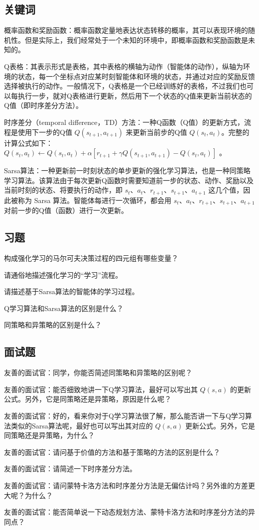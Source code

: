 \subsection{关键词}

概率函数和奖励函数：概率函数定量地表达状态转移的概率，其可以表现环境的随机性。但是实际上，我们经常处于一个未知的环境中，即概率函数和奖励函数是未知的。

Q表格：其表示形式是表格，其中表格的横轴为动作（智能体的动作），纵轴为环境的状态，每一个坐标点对应某时刻智能体和环境的状态，并通过对应的奖励反馈选择被执行的动作。一般情况下，Q表格是一个已经训练好的表格，不过我们也可以每执行一步，就对Q表格进行更新，然后用下一个状态的Q值来更新当前状态的Q值（即时序差分方法）。

时序差分（temporal difference，TD）方法：一种Q函数（Q值）的更新方式，流程是使用下一步的Q值 $Q(s_{t+1},a_{t+1})$ 来更新当前步的Q值 $Q(s_t,a_t)$。完整的计算公式如下：$Q(s_t,a_t) \leftarrow Q(s_t,a_t) + \alpha [r_{t+1}+\gamma Q(s_{t+1},a_{t+1})-Q(s_t,a_t)]$ 。

Sarsa算法：一种更新前一时刻状态的单步更新的强化学习算法，也是一种同策略学习算法。该算法由于每次更新Q函数时需要知道前一步的状态、动作、奖励以及当前时刻的状态、将要执行的动作，即 $s_{t}$、$a_{t}$、$r_{t+1}$、$s_{t+1}$、$a_{t+1}$ 这几个值，因此被称为 Sarsa 算法。智能体每进行一次循环，都会用 $s_{t}$、$a_{t}$、$r_{t+1}$、$s_{t+1}$、$a_{t+1}$ 对前一步的Q值（函数）进行一次更新。


\subsection{习题}

 构成强化学习的马尔可夫决策过程的四元组有哪些变量？

 请通俗地描述强化学习的“学习”流程。

 请描述基于Sarsa算法的智能体的学习过程。

 Q学习算法和Sarsa算法的区别是什么？
	
 同策略和异策略的区别是什么？
 

\subsection{面试题}

 友善的面试官：同学，你能否简述同策略和异策略的区别呢？

 友善的面试官：能否细致地讲一下Q学习算法，最好可以写出其 $Q(s,a)$ 的更新公式。另外，它是同策略还是异策略，原因是什么呢？

 友善的面试官：好的，看来你对于Q学习算法很了解，那么能否讲一下与Q学习算法类似的Sarsa算法呢，最好也可以写出其对应的 $Q(s,a)$ 更新公式。另外，它是同策略还是异策略，为什么？

 友善的面试官：请问基于价值的方法和基于策略的方法的区别是什么？

 友善的面试官：请简述一下时序差分方法。

 友善的面试官：请问蒙特卡洛方法和时序差分方法是无偏估计吗？另外谁的方差更大呢？为什么？

 友善的面试官：能否简单说一下动态规划方法、蒙特卡洛方法和时序差分方法的异同点？
